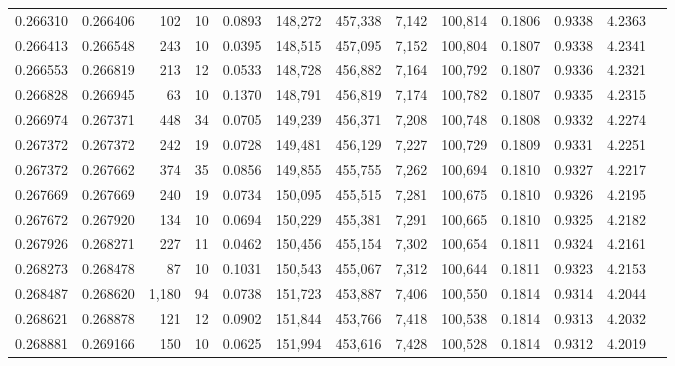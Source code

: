 \begin{tabular}{rrrrrrrrrrrrr}
0.266310 & 0.266406 &   102 &  10 &                                     0.0893 & 148,272 & 457,338 &   7,142 & 100,814 & 0.1806 & 0.9338 & 4.2363 \\
0.266413 & 0.266548 &   243 &  10 &                                     0.0395 & 148,515 & 457,095 &   7,152 & 100,804 & 0.1807 & 0.9338 & 4.2341 \\
0.266553 & 0.266819 &   213 &  12 &                                     0.0533 & 148,728 & 456,882 &   7,164 & 100,792 & 0.1807 & 0.9336 & 4.2321 \\
0.266828 & 0.266945 &    63 &  10 &                                     0.1370 & 148,791 & 456,819 &   7,174 & 100,782 & 0.1807 & 0.9335 & 4.2315 \\
0.266974 & 0.267371 &   448 &  34 &                                     0.0705 & 149,239 & 456,371 &   7,208 & 100,748 & 0.1808 & 0.9332 & 4.2274 \\
0.267372 & 0.267372 &   242 &  19 &                                     0.0728 & 149,481 & 456,129 &   7,227 & 100,729 & 0.1809 & 0.9331 & 4.2251 \\
0.267372 & 0.267662 &   374 &  35 &                                     0.0856 & 149,855 & 455,755 &   7,262 & 100,694 & 0.1810 & 0.9327 & 4.2217 \\
0.267669 & 0.267669 &   240 &  19 &                                     0.0734 & 150,095 & 455,515 &   7,281 & 100,675 & 0.1810 & 0.9326 & 4.2195 \\
0.267672 & 0.267920 &   134 &  10 &                                     0.0694 & 150,229 & 455,381 &   7,291 & 100,665 & 0.1810 & 0.9325 & 4.2182 \\
0.267926 & 0.268271 &   227 &  11 &                                     0.0462 & 150,456 & 455,154 &   7,302 & 100,654 & 0.1811 & 0.9324 & 4.2161 \\
0.268273 & 0.268478 &    87 &  10 &                                     0.1031 & 150,543 & 455,067 &   7,312 & 100,644 & 0.1811 & 0.9323 & 4.2153 \\
0.268487 & 0.268620 & 1,180 &  94 &                                     0.0738 & 151,723 & 453,887 &   7,406 & 100,550 & 0.1814 & 0.9314 & 4.2044 \\
0.268621 & 0.268878 &   121 &  12 &                                     0.0902 & 151,844 & 453,766 &   7,418 & 100,538 & 0.1814 & 0.9313 & 4.2032 \\
0.268881 & 0.269166 &   150 &  10 &                                     0.0625 & 151,994 & 453,616 &   7,428 & 100,528 & 0.1814 & 0.9312 & 4.2019 \\

\end{tabular}
